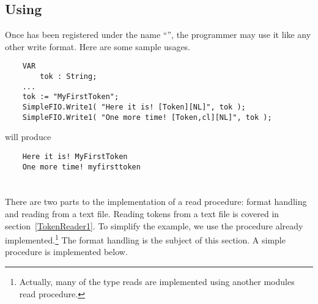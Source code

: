 
\subsection{Using }

Once  has been registered under the name ``'',
the programmer may use it like any other write format.  Here are some
sample usages.
\begin{verbatim}
    VAR
        tok : String;
    ...
    tok := "MyFirstToken";
    SimpleFIO.Write1( "Here it is! [Token][NL]", tok );
    SimpleFIO.Write1( "One more time! [Token,cl][NL]", tok );
\end{verbatim}
will produce
\begin{verbatim}
    Here it is! MyFirstToken
    One more time! myfirsttoken
\end{verbatim}



\section{}

There are two parts to the implementation of a  read procedure:
format handling and reading from a text file.  Reading tokens from
a text file is covered in section~\ref{TokenReader1}.  To simplify
the example, we use the procedure  already
implemented.\footnote{
     Actually, many of the  type reads are implemented
     using another modules read procedure.}
The format handling is the subject of this section.   A simple
 procedure is implemented below.


